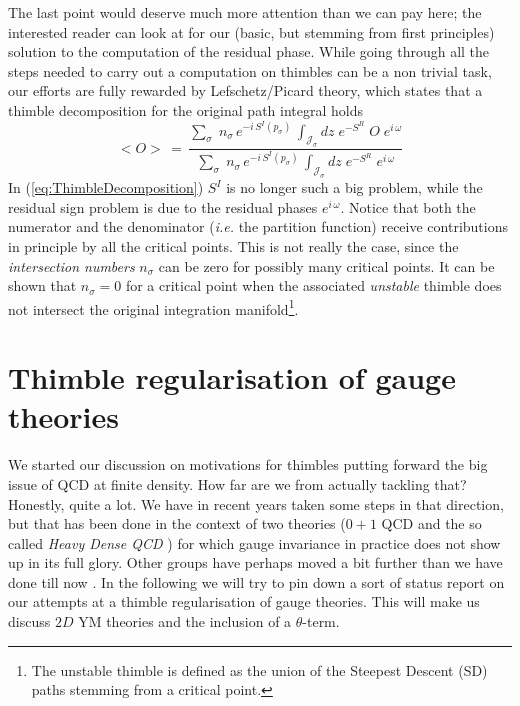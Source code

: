\documentclass[a4paper,11pt]{article}
\begin{document}
The last point would deserve much more attention than we can pay here;
the interested reader can look at \cite{thimbleRMT} for our (basic,
but stemming from first principles) solution to the computation of 
the residual phase. 
While going through all the steps needed to carry out a computation on
thimbles can be a non trivial task, our efforts are fully rewarded by 
Lefschetz/Picard theory, which states that a thimble decomposition 
for the original path integral holds
\begin{equation}
<O> \, = \, \frac{\sum_{\sigma} \; n_{\sigma} \,
  e^{-i\,S^I(p_{\sigma})} \, \int_{\mathcal{J}_\sigma} dz \;
  e^{-S^R}\; O\; e^{i\,\omega}}{\sum_{\sigma} \; n_{\sigma} \, e^{-i\,S^I(p_{\sigma})}\, \int_{\mathcal{J}_\sigma} dz \;
  e^{-S^R}\; e^{i\,\omega}}
\label{eq:ThimbleDecomposition}
\end{equation}
In (\ref{eq:ThimbleDecomposition}) $S^I$ is no longer such a big problem, 
while the residual sign problem is due to the residual phases
$e^{i\,\omega}$. Notice that both the numerator
and the denominator ({\em i.e.} the partition function) receive
contributions in principle by all the critical points. This is not
really the case, since the {\em
intersection numbers} $n_{\sigma}$ can be zero for possibly many
critical points. It can be shown that $n_{\sigma}=0$ for a critical point when the
associated {\em unstable} thimble does not intersect the original
integration manifold\footnote{The unstable thimble is defined as the union of
the Steepest Descent (SD) paths stemming from a critical point.}.\\

\section{Thimble regularisation of gauge theories}

We started our discussion on motivations for thimbles putting forward
the big issue of QCD at finite density. How far are we from actually
tackling that? Honestly, quite a lot. We have in recent years taken
some steps in that direction, but that has been done in the context of
two theories ($0+1$ QCD \cite{QCD01} and the so called {\em Heavy Dense
  QCD} \cite{Zambello:2018ibq}) for which gauge invariance in
practice does not show up in its full glory. Other groups have perhaps
moved a bit further than we have done till now 
\cite{Alexandru:2018ngw,Pawlowski:2021bbu}. In the following we will
try to pin down a sort of status report on our attempts at a thimble
regularisation of gauge theories. This will make us discuss $2D$ YM
theories and the inclusion of a $\theta$-term.
\end{document}
